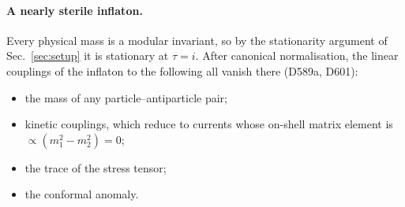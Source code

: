 \documentclass[aps,prd,twocolumn,superscriptaddress,nofootinbib,floatfix]{revtex4-2}
\begin{document}
\paragraph{A nearly sterile inflaton.} Every physical mass is a modular invariant, so by the stationarity argument of Sec.~\ref{sec:setup} it is stationary at $\tau = i$. After canonical normalisation, the linear couplings of the inflaton to the following all vanish there (D589a, D601):
\begin{itemize}
\item the mass of any particle--antiparticle pair;
\item kinetic couplings, which reduce to currents whose on-shell matrix element is $\propto(m_1^2 - m_2^2) = 0$;
\item the trace of the stress tensor;
\item the conformal anomaly.
\end{itemize}
\end{document}

